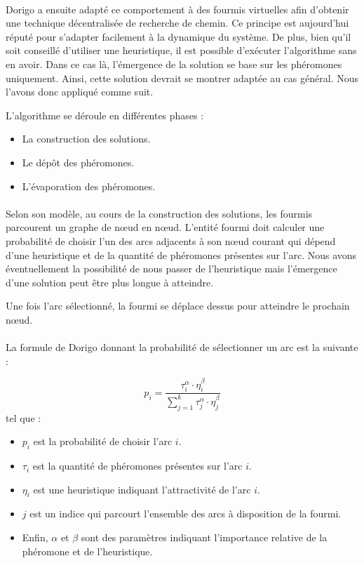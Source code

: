 \documentclass[a4paper, 10pt]{report}
\begin{document}
\paragraph{}Dorigo a ensuite adapté ce comportement à des fourmis virtuelles afin d'obtenir une technique décentralisée de recherche de chemin. Ce principe est aujourd'hui réputé pour s'adapter facilement à la dynamique du système. De plus, bien qu'il soit conseillé d'utiliser une heuristique, il est possible d'exécuter l'algorithme sans en avoir. Dans ce cas là, l'émergence de la solution se base sur les phéromones uniquement. Ainsi, cette solution devrait se montrer adaptée au cas général. Nous l'avons donc appliqué comme suit.

L'algorithme se déroule en différentes phases :
\begin{itemize}
    \item La construction des solutions.
    \item Le dépôt des phéromones.
    \item L'évaporation des phéromones.
\end{itemize}

\paragraph{}Selon son modèle, au cours de la construction des solutions, les fourmis parcourent un graphe de n\oe ud en n\oe ud. L'entité fourmi doit calculer une probabilité de choisir l'un des arcs adjacents à son n\oe ud courant qui dépend d'une heuristique et de la quantité de phéromones présentes sur l'arc. Nous avons éventuellement la possibilité de nous passer de l'heuristique mais l'émergence d'une solution peut être plus longue à atteindre. 

Une fois l'arc sélectionné, la fourmi se déplace dessus pour atteindre le prochain n\oe ud. 

\paragraph{}La formule de Dorigo donnant la probabilité de sélectionner un arc est la suivante : 

$$
	p_i = \frac{\tau_{i}^{\alpha}\cdot \eta_{i}^{\beta}}{ \sum\limits_{j=1}^{k}\tau_{j}^{\alpha}\cdot \eta_{j}^{\beta}}
$$
tel que :
\begin{itemize}
    \item $p_{i}$ est la probabilité de choisir l'arc $i$.
    \item $\tau_i$ est la quantité de phéromones présentes sur l'arc $i$.
    \item $\eta_i$ est une heuristique indiquant l'attractivité de l'arc $i$.
    \item $j$ est un indice qui parcourt l'ensemble des arcs à disposition de la fourmi.
    \item Enfin, $\alpha$ et $\beta$ sont des paramètres indiquant l'importance relative de la phéromone et de l'heuristique.
\end{itemize}
\end{document}
